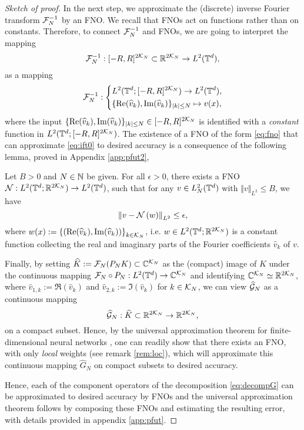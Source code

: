 \documentclass[reqno,a4paper]{amsart}
\begin{document}
\begin{proof}[Sketch of proof]
In the next step, we approximate the (discrete) inverse Fourier transform $\mathcal{F}_N^{-1}$ by an FNO. We recall that FNOs act on functions rather than on constants. Therefore, to connect $\mathcal{F}_N^{-1}$ and FNOs, we are going to interpret the mapping 
\[
\mathcal{F}_N^{-1}: [-R,R]^{2\mathcal{K}_N} \subset \mathbb{R}^{2\mathcal{K}_N} \to L^2(\mathbb{T}^d),
\]
as a mapping 
\begin{align*}
\mathcal{F}_N^{-1}:
\left\{
\begin{aligned}
&L^2(\mathbb{T}^d; [-R,R]^{2\mathcal{K}_N}) \to L^2(\mathbb{T}^d),
\\
&\{\mathrm{Re}(\widehat{v}_k), \mathrm{Im}(\widehat{v}_k)\}_{|k|\le N} \mapsto v(x),
\end{aligned}
\right.
\end{align*}
where the input $\{\mathrm{Re}(\widehat{v}_k), \mathrm{Im}(\widehat{v}_k)\}_{|k|\le N} \in [-R,R]^{2\mathcal{K}_N}$ is identified with a \emph{constant} function in $L^2(\mathbb{T}^d;[-R,R]^{2 \mathcal{K}_N})$. The existence of a FNO of the form \eqref{eq:fno} that can approximate \eqref{eq:ift0} to desired accuracy is a consequence of the following lemma, proved in Appendix \ref{app:pfut2},
\begin{lemma} \label{lem:fno-ift}
Let $B > 0$ and $N \in \mathbb{N}$ be given. For all $\epsilon> 0$, there exists a FNO $\mathcal{N}: L^2(\mathbb{T}^d;\mathbb{R}^{2\mathcal{K}_N}) \to L^2(\mathbb{T}^d)$, such that for any $v \in L^2_N(\mathbb{T}^d)$ with $\Vert v \Vert_{L^2} \le B$, we have
\[
\left\Vert 
v
-
\mathcal{N}\left(
w
\right)
\right\Vert_{L^2} 
\le \epsilon,
\]
where $w(x) := \left\{(\mathrm{Re}(\widehat{v}_k), \mathrm{Im}(\widehat{v}_k))\right\}_{k\in \mathcal{K}_N}$, i.e. $w\in L^2(\mathbb{T}^d;\mathbb{R}^{2\mathcal{K}_N})$ is a constant function collecting the real and imaginary parts of the Fourier coefficients $\hat{v}_k$ of $v$.
\end{lemma}
Finally, by setting $\widehat{K} := \mathcal{F}_N(P_N K) \subset \mathbb{C}^{\mathcal{K}_N}$ as the (compact) image of $K$ under the continuous mapping $\mathcal{F}_N \circ P_N: L^2(\mathbb{T}^d) \to \mathbb{C}^{\mathcal{K}_N}$ and identifying $\mathbb{C}^{\mathcal{K}_N} \simeq \mathbb{R}^{2\mathcal{K}_N}$, where $\hat{v}_{1,k} := \Re(\hat{v}_k)$ and $\hat{v}_{2,k} := \Im(\hat{v}_k)$ for $k\in \mathcal{K}_N$, we can view $\widehat{\mathcal{G}}_N$ as a continuous mapping
\[
\widehat{\mathcal{G}}_N: \widehat{K} \subset \mathbb{R}^{2\mathcal{K}_N} \to \mathbb{R}^{2\mathcal{K}_N},
\]
on a compact subset. Hence, by the universal approximation theorem for finite-dimensional neural networks \cite{BAR1,HOR1}, one can readily show that there exists an FNO, with only 
\emph{local} weights (see remark \ref{rem:loc}), which will approximate this continuous mapping $\hat{G}_N$ on compact subsets to desired accuracy. 

Hence, each of the component operators of the decomposition \eqref{eq:decompG} can be approximated to desired accuracy by FNOs and the universal approximation theorem follows by composing these FNOs and estimating the resulting error, with details provided in appendix \ref{app:pfut}. 
\end{proof}
\end{document}
